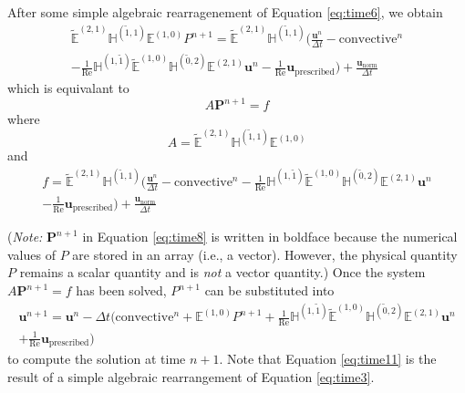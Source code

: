 After some simple algebraic rearragenement of Equation \eqref{eq:time6}, we obtain
\begin{multline}
    \label{eq:time7}
    \tilde{\mathbb{E}}^{(2,1)} \mathbb{H}^{(\tilde{1},1)} \mathbb{E}^{(1,0)} P^{n+1} = \tilde{\mathbb{E}}^{(2,1)} \mathbb{H}^{(\tilde{1},1)} \biggl( \frac{\mathbf{u}^{n}}{\Delta t} - \text{convective}^{n} \\
    - \frac{1}{\text{Re}} \mathbb{H}^{(1,\tilde{1})} \tilde{\mathbb{E}}^{(1,0)} \mathbb{H}^{(\tilde{0},2)} \mathbb{E}^{(2,1)} \mathbf{u}^{n} - \frac{1}{\text{Re}} \mathbf{u}_{\text{prescribed}} \biggr) + \frac{\mathbf{u}^{}_{\text{norm}}}{\Delta t}
\end{multline}
which is equivalant to
\begin{equation}
    \label{eq:time8}
    A \mathbf{P}^{n+1} = f
\end{equation}
where
\begin{equation}
    \label{eq:time9}
    A = \tilde{\mathbb{E}}^{(2,1)} \mathbb{H}^{(\tilde{1},1)} \mathbb{E}^{(1,0)}
\end{equation}
and
\begin{multline}
    \label{eq:time10}
    f = \tilde{\mathbb{E}}^{(2,1)} \mathbb{H}^{(\tilde{1},1)} \biggl( \frac{\mathbf{u}^{n}}{\Delta t} - \text{convective}^{n} - \frac{1}{\text{Re}} \mathbb{H}^{(1,\tilde{1})} \tilde{\mathbb{E}}^{(1,0)} \mathbb{H}^{(\tilde{0},2)} \mathbb{E}^{(2,1)} \mathbf{u}^{n} \\
    - \frac{1}{\text{Re}} \mathbf{u}_{\text{prescribed}} \biggr) + \frac{\mathbf{u}^{}_{\text{norm}}}{\Delta t}
\end{multline}

(\textit{Note:} $\mathbf{P}^{n+1}$ in Equation \eqref{eq:time8} is written in boldface  because the numerical values of $P$ are stored in an array (i.e., a vector). However, the physical quantity $P$ remains a scalar quantity and is \emph{not} a vector quantity.) Once the system $A \mathbf{P}^{n+1} = f$ has been solved, $P^{n+1}$ can be substituted into
\begin{multline}
    \label{eq:time11}
    \mathbf{u}^{n+1} = \mathbf{u}^{n} - \Delta t \biggl( \text{convective}^{n} + \mathbb{E}^{(1,0)} P^{n+1} + \frac{1}{\text{Re}} \mathbb{H}^{(1,\tilde{1})} \tilde{\mathbb{E}}^{(1,0)} \mathbb{H}^{(\tilde{0},2)} \mathbb{E}^{(2,1)} \mathbf{u}^{n} \\
    + \frac{1}{\text{Re}} \mathbf{u}_{\text{prescribed}} \biggr)
\end{multline}
to compute the solution at time $n + 1$. Note that Equation \eqref{eq:time11} is the result of a simple algebraic rearrangement of Equation \eqref{eq:time3}.
